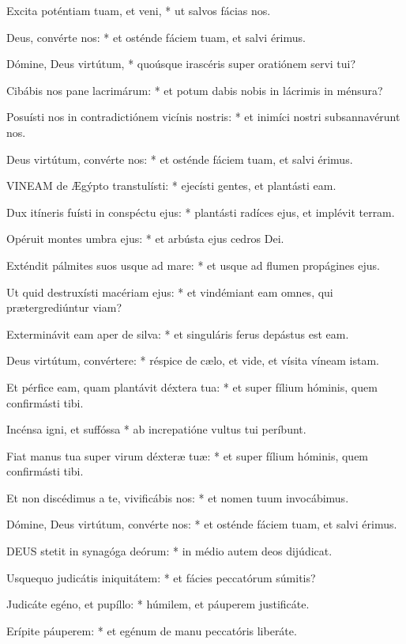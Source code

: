 Excita poténtiam tuam, et veni, * ut salvos fácias nos.

Deus, convérte nos: * et osténde fáciem tuam, et salvi érimus.

Dómine, Deus virtútum, * quoúsque irascéris super oratiónem servi tui?

Cibábis nos pane lacrimárum: * et potum dabis nobis in lácrimis in ménsura?

Posuísti nos in contradictiónem vicínis nostris: * et inimíci nostri subsannavérunt nos.

Deus virtútum, convérte nos: * et osténde fáciem tuam, et salvi érimus.


\lettrine[lines=2]{V}{INEAM} de Ægýpto transtulísti: * ejecísti gentes, et plantásti eam.

Dux itíneris fuísti in conspéctu ejus: * plantásti radíces ejus, et implévit terram.

Opéruit montes umbra ejus: * et arbústa ejus cedros Dei.

Exténdit pálmites suos usque ad mare: * et usque ad flumen propágines ejus.

Ut quid destruxísti macériam ejus: * et vindémiant eam omnes, qui prætergrediúntur viam?

Exterminávit eam aper de silva: * et singuláris ferus depástus est eam.

Deus virtútum, convértere: * réspice de cælo, et vide, et vísita víneam istam.

Et pérfice eam, quam plantávit déxtera tua: * et super fílium hóminis, quem confirmásti tibi.

Incénsa igni, et suffóssa * ab increpatióne vultus tui períbunt.

Fiat manus tua super virum déxteræ tuæ: * et super fílium hóminis, quem confirmásti tibi.

Et non discédimus a te, vivificábis nos: * et nomen tuum invocábimus.

Dómine, Deus virtútum, convérte nos: * et osténde fáciem tuam, et salvi érimus.


\lettrine[lines=2]{D}{EUS} stetit in synagóga deórum: * in médio autem deos dijúdicat.

Usquequo judicátis iniquitátem: * et fácies peccatórum súmitis?

Judicáte egéno, et pupíllo: * húmilem, et páuperem justificáte.

Erípite páuperem: * et egénum de manu peccatóris liberáte.

